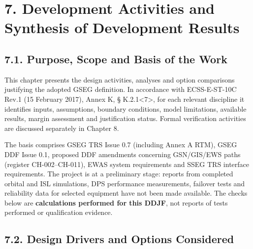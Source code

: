 \section{7. Development Activities and Synthesis of Development Results}\label{ddjf-7}

\subsection{7.1. Purpose, Scope and Basis of the Work}\label{ddjf-7-1}

This chapter presents the design activities, analyses and option comparisons justifying the adopted GSEG definition. In accordance with ECSS-E-ST-10C Rev.1 (15 February 2017), Annex K, § K.2.1<7>, for each relevant discipline it identifies inputs, assumptions, boundary conditions, model limitations, available results, margin assessment and justification status. Formal verification activities are discussed separately in Chapter 8.

The basis comprises GSEG TRS Issue 0.7 (including Annex A RTM), GSEG DDF Issue 0.1, proposed DDF amendments concerning GSN/\allowbreak{}GIS/\allowbreak{}EWS paths (register CH-002–CH-011), EWAS system requirements and SSEG TRS interface requirements. The project is at a preliminary stage: reports from completed orbital and ISL simulations, DPS performance measurements, failover tests and reliability data for selected equipment have not been made available. The checks below are \textbf{calculations performed for this DDJF}, not reports of tests performed or qualification evidence.

\subsection{7.2. Design Drivers and Options Considered}\label{ddjf-7-2}


